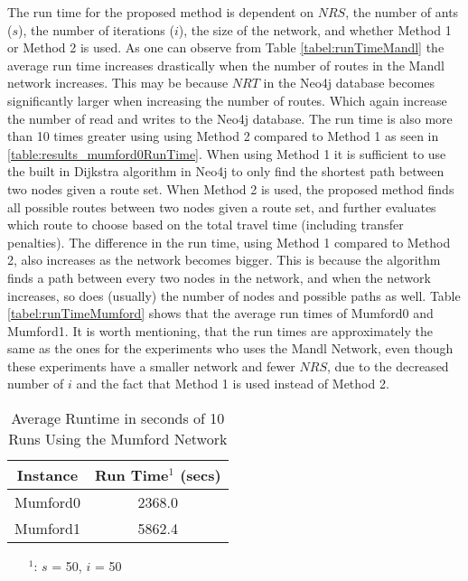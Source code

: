 The run time for the proposed method is dependent on $NRS$, the number of ants ($s$), the number of iterations ($i$), the size of the network, and whether Method 1 or Method 2 is used. As one can observe from Table \vref{tabel:runTimeMandl} the average run time increases drastically when the number of routes in the Mandl network increases. This may be because $NRT$ in the Neo4j database becomes significantly larger when increasing the number of routes. Which again increase the number of read and writes to the Neo4j database. The run time is also more than 10 times greater using using Method 2 compared to Method 1 as seen in \vref{table:results_mumford0RunTime}. When using Method 1 it is sufficient to use the built in Dijkstra algorithm in Neo4j to only find the shortest path between two nodes given a route set. When Method 2 is used, the proposed method finds all possible routes between two nodes given a route set, and further evaluates which route to choose based on the total travel time (including transfer penalties). The difference in the run time, using Method 1 compared to Method 2, also increases as the network becomes bigger. This is because the algorithm finds a path between every two nodes in the network, and when the network increases, so does (usually) the number of nodes and possible paths as well. Table \vref{tabel:runTimeMumford} shows that the average run times of Mumford0 and Mumford1. It is worth mentioning, that the run times are approximately the same as the ones for the experiments who uses the Mandl Network, even though these experiments have a smaller network and fewer $NRS$, due to the decreased number of $i$ and the fact that Method 1 is used instead of Method 2. 


\begin{table}[H]
    \centering
    \hspace*{-1.0cm}
    \begin{tabular}{|c|c|}
        \hline
        \textbf{Instance} & \textbf{Run Time$^1$ (secs)} \\
        \hline
        Mumford0 & 2368.0\\
        \hline
        Mumford1 & 5862.4\\
        \hline
    \end{tabular}
    \caption{Average Runtime in seconds of 10 Runs Using the Mumford Network}
    \label{tabel:runTimeMumford}
    \begin{itemize}[noitemsep]
    \item[$^1$:] $s$ = 50, $i$ = 50
    \end{itemize} 
\end{table}


